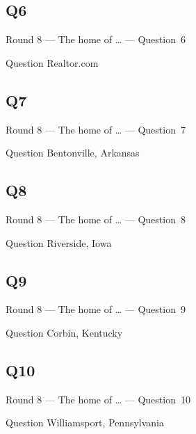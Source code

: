 \documentclass[11pt]{beamer}
\begin{document}
\subsection*{Q6}
\begin{frame}[t]{Round 8 --- The home of \ldots{} --- \mbox{Question 6}}
    \vspace{-0.5em}
    \begin{block}{Question}
        Realtor.com
    \end{block}
\end{frame}
\subsection*{Q7}
\begin{frame}[t]{Round 8 --- The home of \ldots{} --- \mbox{Question 7}}
    \vspace{-0.5em}
    \begin{block}{Question}
        Bentonville, Arkansas
    \end{block}
\end{frame}
\subsection*{Q8}
\begin{frame}[t]{Round 8 --- The home of \ldots{} --- \mbox{Question 8}}
    \vspace{-0.5em}
    \begin{block}{Question}
        Riverside, Iowa
    \end{block}
\end{frame}
\subsection*{Q9}
\begin{frame}[t]{Round 8 --- The home of \ldots{} --- \mbox{Question 9}}
    \vspace{-0.5em}
    \begin{block}{Question}
        Corbin, Kentucky
    \end{block}
\end{frame}
\subsection*{Q10}
\begin{frame}[t]{Round 8 --- The home of \ldots{} --- \mbox{Question 10}}
    \vspace{-0.5em}
    \begin{block}{Question}
        Williamsport, Pennsylvania
    \end{block}
\end{frame}
\end{document}
